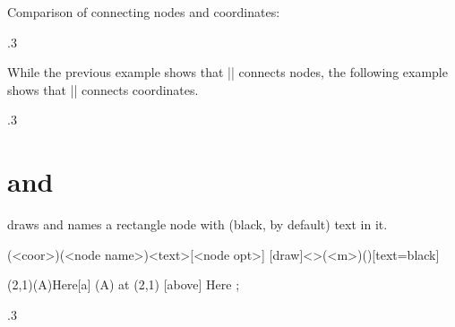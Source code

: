 \remark Comparison of connecting nodes and coordinates:


\begin{tzcode}{.3}
{}
\end{tzcode}

While the previous example shows that |\tzlines| connects nodes,
the following example shows that |\tzlines| connects coordinates.


\begin{tzcode}{.3}
{}
\end{tzcode}




\section{\protect\cmd{\tznodeframe} and \protect\cmd{\tznodeframe*}}
\label{s:tznodeframe}

\icmd{\tznodeframe} draws and  names a rectangle node with (black, by default) text in it.


\begin{tzdef}{}
\tznodeframe[<opt>](<coor>)(<node name>){<text>}[<node opt>]
 [draw]<>(<m>)(){}[text=black]
\end{tzdef}

\begin{tztikz}{}
\tznodeframe(2,1)(A){Here}[a]         %
   (A) at (2,1) [above] {Here} ;
\end{tztikz}


\begin{tzcode}{.3}
{}
\end{tzcode}

